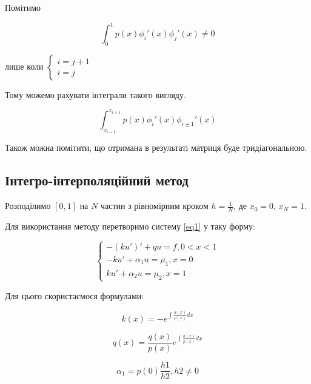 \documentclass[14pt,a4paper]{scrartcl}
\begin{document}
	Помітимо
	
	\begin{equation} \label{eq5}
	\int_{0}^{1} p(x)\phi_{i}'(x)\phi_{j}'(x) \ne 0 
	\end{equation}
	
	лише коли $ \left\{
	\begin{array}{ll}
	i = j+1 \\
	i = j
	\end{array}\right.
	$
	
	Тому можемо рахувати інтеграли такого вигляду.
	
	\begin{equation} \label{eq6}
	\int_{x_{i-1}}^{x_{i+1}} p(x)\phi_{i}'(x)\phi_{i \pm 1}'(x)
	\end{equation}
	
	Також можна помітити, що отримана в результаті матриця буде тридіагональною. 
	
	\subsection{Інтегро-інтерполяційний метод}
	
	Розподілимо $[0,1]$ на $N$ частин з рівномірним кроком $h= \frac{1}{N}$, де $x_{0} = 0$, $x_{N} = 1$.
	
	Для використання методу перетворимо систему \ref{eq1} у таку форму:
	
	\begin{equation}\label{eq10}
	\left\{
	\begin{array}{ll}
		-(ku')' +qu = f, 0<x<1 \\
		-ku' + \alpha_{1}u = \mu_{1}, x =0\\
		ku' + \alpha_{2}u = \mu_{2}, x =1
	\end{array}\right.
	\end{equation}
	
	Для цього скористаємося формулами:
	
	\begin{equation}\label{eq11}
		k(x) = -e^{\int \frac{a(x)}{p(x)} dx}
	\end{equation}

	\begin{equation}\label{eq12}
		q(x) = \frac{q(x)}{p(x)} e^{\int \frac{a(x)}{p(x)} dx}
	\end{equation}	
	
	\begin{equation}\label{eq13}
		\alpha_{1} = p(0)\frac{h1}{h2}, h2 \ne 0
	\end{equation}


	
\end{document}
